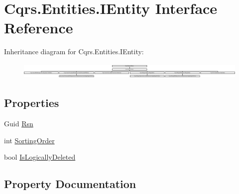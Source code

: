 \hypertarget{interfaceCqrs_1_1Entities_1_1IEntity}{}\section{Cqrs.\+Entities.\+I\+Entity Interface Reference}
\label{interfaceCqrs_1_1Entities_1_1IEntity}
Inheritance diagram for Cqrs.\+Entities.\+I\+Entity\+:\begin{figure}[H]
\begin{center}
\leavevmode
\includegraphics[height=0.801144cm]{interfaceCqrs_1_1Entities_1_1IEntity}
\end{center}
\end{figure}
\subsection*{Properties}
\begin{DoxyCompactItemize}
\item 
Guid \hyperlink{interfaceCqrs_1_1Entities_1_1IEntity_af2bfc288bc574712d7f00af608789f8d_af2bfc288bc574712d7f00af608789f8d}{Rsn}
\item 
int \hyperlink{interfaceCqrs_1_1Entities_1_1IEntity_a3de43465f8acc41ff10fd69a8c060225_a3de43465f8acc41ff10fd69a8c060225}{Sorting\+Order}
\item 
bool \hyperlink{interfaceCqrs_1_1Entities_1_1IEntity_a4c682465a1c45a70380c2ca5e9cab15f_a4c682465a1c45a70380c2ca5e9cab15f}{Is\+Logically\+Deleted}
\end{DoxyCompactItemize}


\subsection{Property Documentation}
\mbox{\label{interfaceCqrs_1_1Entities_1_1IEntity_a4c682465a1c45a70380c2ca5e9cab15f_a4c682465a1c45a70380c2ca5e9cab15f}} 
